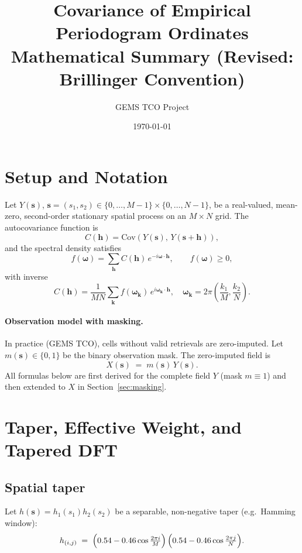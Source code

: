 \documentclass[12pt]{article}
\title{\textbf{Covariance of Empirical Periodogram Ordinates}\\
\large Mathematical Summary (Revised: Brillinger Convention)}
\author{GEMS TCO Project}
\date{\today}
\theoremstyle{definition}
\begin{document}
\maketitle
\tableofcontents
\newpage

\section{Setup and Notation}

Let $Y(\mathbf{s})$, $\mathbf{s} = (s_1, s_2) \in \{0,\ldots,M-1\}\times\{0,\ldots,N-1\}$,
be a real-valued, mean-zero, second-order stationary spatial process on
an $M\times N$ grid.
The autocovariance function is
\[
  C(\mathbf{h}) = \mathrm{Cov}(Y(\mathbf{s}),\, Y(\mathbf{s}+\mathbf{h})),
\]
and the spectral density satisfies
\[
  f(\boldsymbol{\omega}) = \sum_{\mathbf{h}} C(\mathbf{h})\,e^{-i\boldsymbol{\omega}\cdot\mathbf{h}},
  \qquad f(\boldsymbol{\omega}) \geq 0,
\]
with inverse
\[
  C(\mathbf{h}) = \frac{1}{MN}\sum_{\mathbf{k}} f(\boldsymbol{\omega}_{\mathbf{k}})\,
    e^{i\boldsymbol{\omega}_{\mathbf{k}}\cdot\mathbf{h}},
  \quad
  \boldsymbol{\omega}_{\mathbf{k}} = 2\pi\!\left(\frac{k_1}{M},\frac{k_2}{N}\right).
\]

\paragraph{Observation model with masking.}
In practice (GEMS TCO), cells without valid retrievals are
zero-imputed.  Let $m(\mathbf{s}) \in \{0,1\}$ be the binary observation
mask.  The zero-imputed field is
\[
  X(\mathbf{s}) \;=\; m(\mathbf{s})\,Y(\mathbf{s}).
\]
All formulas below are first derived for the complete field $Y$
(mask $m\equiv 1$) and then extended to $X$ in
Section~\ref{sec:masking}.


\section{Taper, Effective Weight, and Tapered DFT}

\subsection{Spatial taper}

Let $h(\mathbf{s}) = h_1(s_1)h_2(s_2)$ be a separable, non-negative taper
(e.g.\ Hamming window):
\[
  h_{(i,j)}
  \;=\; \Bigl(0.54 - 0.46\cos\tfrac{2\pi i}{M}\Bigr)\,
         \Bigl(0.54 - 0.46\cos\tfrac{2\pi j}{N}\Bigr).
\]
\end{document}
